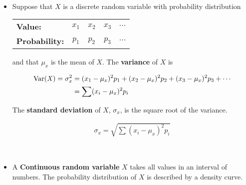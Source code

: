 \documentclass[Main.tex]{subfiles}
\begin{document}
	\begin{example} \hfill \\
		\begin{itemize}				
			\item Suppose that $X$ is a discrete random variable with probability distribution\hfill			 		
			\begin{table}[H]
				\centering
				\begin{tabular}{lcccr}
					\hline
					\textbf{Value:} & $x_{1}$ & $x_{2}$ & $x_{3}$ & $\cdots$ \\
					\textbf{Probability:} & $p_{1}$ & $p_{2}$ & $p_{3}$ & $\cdots$ \\
					\hline
				\end{tabular}
			\end{table}
			and that $\mu_{x}$ is the mean of $X$. The \textbf{variance} of $X$ is\hfill
			\begin{definition}
				\begin{subequations}
					\begin{align}
					\mathrm{Var(\mathit{X})}=\sigma^{2}_{x}&=(x_{1}-\mu_{x})^{2}p_{1}+(x_{2}-\mu_{x})^{2}p_{2}+(x_{3}-\mu_{x})^{2}p_{3}+\cdots\\
					&=\sum(x_{i}-\mu_{x})^{2}p_{i} \notag
					\end{align}
				\end{subequations}	
			\end{definition}\hfill
				
			The \textbf{standard deviation} of $X$, $\sigma_{x}$, is the square root of the variance.
			\begin{definition}
				\begin{subequations}
					\begin{align}
					\sigma_{x}=\sqrt{\sum(x_{i}-\mu_{x})^{2}p_{i}}
					\end{align}
				\end{subequations}	
			\end{definition}\hfill					
		\end{itemize}
	\end{example}
	
	\begin{example} \hfill \\
		\begin{itemize}	
			\item A \textbf{Continuous random variable} $X$ takes all values in an interval of numbers. The probability distribution of $X$ is described by a density curve. 
		\end{itemize}
	\end{example} \newpage																
	
\end{document}
